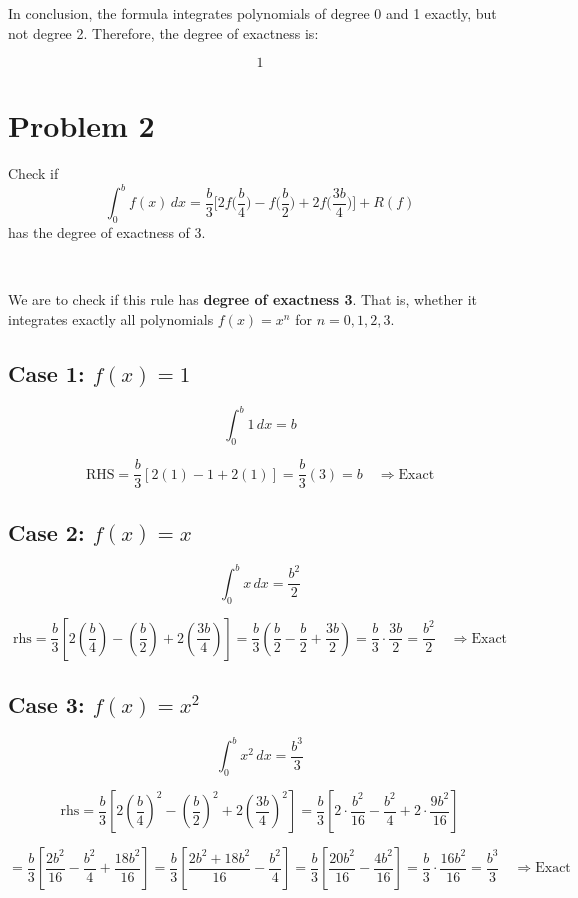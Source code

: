 \documentclass{article}
\begin{document}
In conclusion, the formula integrates polynomials of degree 0 and 1 exactly, but not degree 2. Therefore, the degree of exactness is:

\[
\boxed{1}
\]

\section*{Problem 2}
Check if
\[
    \int_{0}^{b} f(x) \, dx = \frac{b}{3} \bigg[2f\bigg(\frac{b}{4}\bigg) - f\bigg(\frac{b}{2}\bigg) + 2f\bigg(\frac{3b}{4}\bigg)\bigg] +R(f)
\]
has the degree of exactness of 3.

\

We are to check if this rule has \textbf{degree of exactness 3}. That is, whether it integrates exactly all polynomials \( f(x) = x^n \) for \( n = 0, 1, 2, 3 \).

\subsection*{Case 1: \( f(x) = 1 \)}

\[
\int_{0}^{b} 1\, dx = b
\]

\[
\text{RHS} = \frac{b}{3} \left[2(1) - 1 + 2(1)\right] = \frac{b}{3}(3) = b \quad \Rightarrow \text{Exact}
\]

\subsection*{Case 2: \( f(x) = x \)}

\[
\int_{0}^{b} x\, dx = \frac{b^2}{2}
\]

\[
\text{rhs} = \frac{b}{3} \left[2\left(\frac{b}{4}\right) - \left(\frac{b}{2}\right) + 2\left(\frac{3b}{4}\right)\right]
= \frac{b}{3} \left( \frac{b}{2} - \frac{b}{2} + \frac{3b}{2} \right) = \frac{b}{3} \cdot \frac{3b}{2} = \frac{b^2}{2}
\quad \Rightarrow \text{Exact}
\]

\subsection*{Case 3: \( f(x) = x^2 \)}

\[
\int_{0}^{b} x^2\, dx = \frac{b^3}{3}
\]

\[
\text{rhs} = \frac{b}{3} \left[ 2\left( \frac{b}{4} \right)^2 - \left( \frac{b}{2} \right)^2 + 2\left( \frac{3b}{4} \right)^2 \right]
= \frac{b}{3} \left[ 2\cdot\frac{b^2}{16} - \frac{b^2}{4} + 2\cdot\frac{9b^2}{16} \right]
\]

\[
= \frac{b}{3} \left[ \frac{2b^2}{16} - \frac{b^2}{4} + \frac{18b^2}{16} \right]
= \frac{b}{3} \left[ \frac{2b^2 + 18b^2}{16} - \frac{b^2}{4} \right]
= \frac{b}{3} \left[ \frac{20b^2}{16} - \frac{4b^2}{16} \right]
= \frac{b}{3} \cdot \frac{16b^2}{16}
= \frac{b^3}{3}
\quad \Rightarrow \text{Exact}
\]
\end{document}
